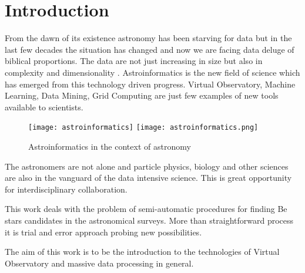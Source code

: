 \chapter*{Introduction}
\cfoot{\thepage}
\fancyhead{}
\fancyhead{}


\renewcommand{\LettrineFontHook}{\color{red}}


\lettrine[lines = 3, loversize=-0.1, lraise=0.1]{F}{}rom the dawn of
its existence astronomy has been starving for data but in the last few
decades the situation has changed and now we are facing data deluge of
biblical proportions. The data are not just increasing in size but
also in complexity and dimensionality
\citep{ballastroinformatics}. Astroinformatics is the new field of
science which has emerged from this technology driven progress.
Virtual Observatory, Machine Learning, Data Mining, Grid Computing are
just few examples of new tools available to scientists.


\vspace{10pt}
\begin{figure}[!htbp]
  \begin{center}
    \leavevmode
    \ifpdf
    \texttt{[image: astroinformatics]}
    \else
    \texttt{[image: astroinformatics.png]}
    \fi
    \caption{Astroinformatics in the context of astronomy \citep{ballastroinformatics} }
    \label{FigAir}
  \end{center}
\end{figure}
\vspace{-10pt}



The astronomers are not alone and particle physics, biology and other
sciences are also in the vanguard of the data intensive science. This
is great opportunity for interdisciplinary collaboration.

This work deals with the problem of semi-automatic procedures for
finding Be stars \citep{porter2003classical} candidates in the
astronomical surveys. More than straightforward process it is trial and
error approach probing new possibilities.

The aim of this work is to be the introduction to the technologies of
Virtual Observatory and massive data processing in general.

